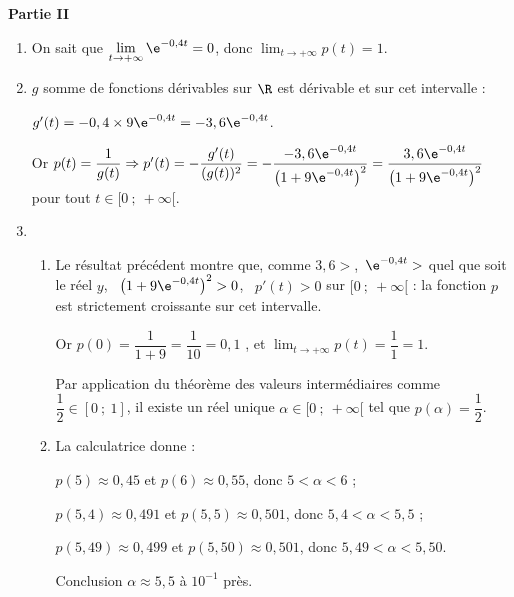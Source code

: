 \textbf{Partie II}

\medskip

%

\smallskip

\begin{enumerate}
\item %
On sait que $\displaystyle\lim_{t \to + \infty} \e^{-0,4t} = 0$, donc $\displaystyle\lim_{t \to + \infty} p(t) = 1$. 
\item %
$g$ somme de fonctions dérivables sur $\R$ est dérivable et sur cet intervalle :

$g'(t) = - 0,4 \times 9\e^{-0,4t} = - 3,6\e^{-0,4t}$.

Or $p(t) = \dfrac{1}{g(t)} \Rightarrow p'(t) = - \dfrac{g'(t)}{(g(t))^2} = - \dfrac{- 3,6\e^{-0,4t}}{\left(1 + 9\e^{-0,4t} \right)^2} = \dfrac{3,6\e^{-0,4t}}{\left(1 + 9\e^{-0,4t} \right)^2}$  pour tout $t \in  [0~;~+ \infty[$.
\item  
	\begin{enumerate}
		\item %
Le résultat précédent montre que, comme $3,6 > $,\, $\e^{-0,4t} > $ quel que soit le réel $y$, \, $\left(1 + 9\e^{-0,4t} \right)^2 > 0$, \, $p'(t) > 0$ sur $[0~;~+ \infty[$ : la fonction $p$ est strictement croissante sur cet intervalle.

Or $p(0) = \dfrac{1}{1 + 9} = \dfrac{1}{10} = 0,1$ ,  et $\displaystyle\lim_{t \to + \infty} p(t) = \dfrac{1}{1} = 1$.

Par application du théorème des valeurs intermédiaires comme $\dfrac{1}{2} \in [0~;~1]$, il existe un réel unique $\alpha \in [0~;~+ \infty[$ tel que $p(\alpha) = \dfrac{1}{2}$.
		\item %
La calculatrice donne :

$p(5) \approx 0,45$ et $p(6) \approx 0,55$, donc $5 < \alpha < 6$ ;

$p(5,4) \approx 0,491$ et $p(5,5) \approx 0,501$, donc $5,4 < \alpha < 5,5$ ;

$p(5,49) \approx 0,499$ et $p(5,50) \approx 0,501$, donc $5,49 < \alpha < 5,50$.

Conclusion $\alpha \approx 5,5$ à $10^{-1}$ près.
	\end{enumerate}
\end{enumerate}

